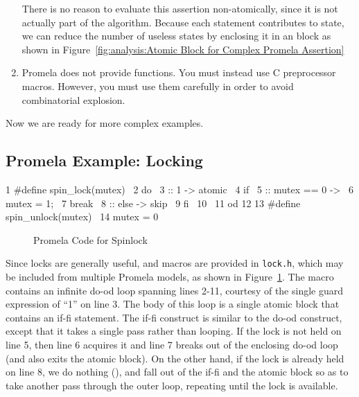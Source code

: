 \begin{enumerate}
	There is no reason to evaluate this assertion
	non-atomically, since it is not actually part of the algorithm.
	Because each statement contributes to state, we can reduce
	the number of useless states by enclosing it in an 
	block as shown in
	Figure~\ref{fig:analysis:Atomic Block for Complex Promela Assertion}

\item	Promela does not provide functions.
	You must instead use C preprocessor macros.
	However, you must use them carefully in order to avoid
	combinatorial explosion.
\end{enumerate}

Now we are ready for more complex examples.

\subsection{Promela Example: Locking}
\label{sec:formal:Promela Example: Locking}

{ \scriptsize
\begin{verbbox}
  1 #define spin_lock(mutex) \
  2   do \
  3   :: 1 -> atomic { \
  4       if \
  5       :: mutex == 0 -> \
  6         mutex = 1; \
  7         break \
  8       :: else -> skip \
  9       fi \
 10     } \
 11   od
 12
 13 #define spin_unlock(mutex) \
 14   mutex = 0
\end{verbbox}
}
\begin{figure}[tbp]
\centering
\theverbbox
\caption{Promela Code for Spinlock}
\label{fig:analysis:Promela Code for Spinlock}
\end{figure}

Since locks are generally useful,  and
macros are provided in {\tt lock.h}, which may be included from
multiple Promela models, as shown in
Figure~\ref{fig:analysis:Promela Code for Spinlock}.
The  macro contains an infinite do-od loop
spanning lines 2-11,
courtesy of the single guard expression of ``1'' on line 3.
The body of this loop is a single atomic block that contains
an if-fi statement.
The if-fi construct is similar to the do-od construct, except
that it takes a single pass rather than looping.
If the lock is not held on line 5, then line 6 acquires it and
line 7 breaks out of the enclosing do-od loop (and also exits
the atomic block).
On the other hand, if the lock is already held on line 8,
we do nothing (\co{skip}), and fall out of the if-fi and the
atomic block so as to take another pass through the outer
loop, repeating until the lock is available.

